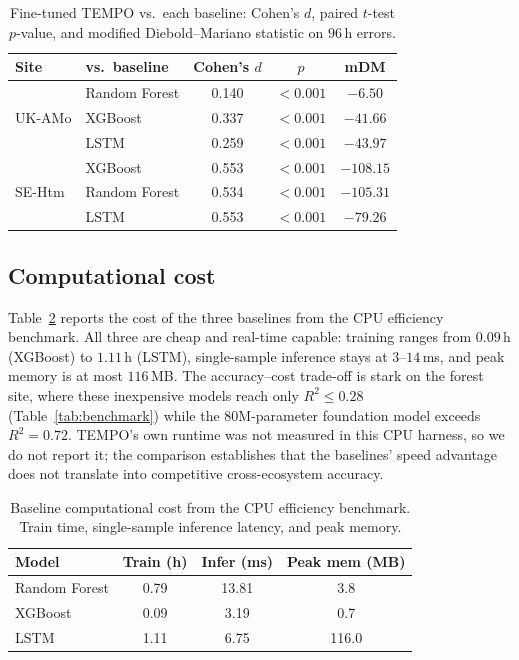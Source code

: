 \documentclass[sigconf]{acmart}          %
\begin{document}
\begin{table}[t]
  \centering
  \caption{Fine-tuned TEMPO vs.\ each baseline: Cohen's $d$, paired $t$-test
  $p$-value, and modified Diebold--Mariano statistic on $96$\,h errors.}
  \label{tab:sig}
  \small
  \begin{tabular}{@{}llccc@{}}
    \toprule
    Site & vs.\ baseline & Cohen's $d$ & $p$ & mDM \\
    \midrule
    \multirow{3}{*}{UK-AMo}
      & Random Forest & 0.140 & $<0.001$ & $-6.50$ \\
      & XGBoost       & 0.337 & $<0.001$ & $-41.66$ \\
      & LSTM          & 0.259 & $<0.001$ & $-43.97$ \\
    \midrule
    \multirow{3}{*}{SE-Htm}
      & XGBoost       & 0.553 & $<0.001$ & $-108.15$ \\
      & Random Forest & 0.534 & $<0.001$ & $-105.31$ \\
      & LSTM          & 0.553 & $<0.001$ & $-79.26$ \\
    \bottomrule
  \end{tabular}
\end{table}

\subsection{Computational cost}
\label{sec:cost}
Table~\ref{tab:cost} reports the cost of the three baselines from the CPU
efficiency benchmark. All three are cheap and real-time capable: training
ranges from $0.09$\,h (XGBoost) to $1.11$\,h (LSTM), single-sample inference
stays at $3$--$14$\,ms, and peak memory is at most $116$\,MB. The accuracy--cost
trade-off is stark on the forest site, where these inexpensive models reach
only $R^2\le0.28$ (Table~\ref{tab:benchmark}) while the $80$M-parameter
foundation model exceeds $R^2=0.72$. TEMPO's own runtime was not measured in
this CPU harness, so we do not report it; the comparison establishes that the
baselines' speed advantage does not translate into competitive cross-ecosystem
accuracy.

\begin{table}[t]
  \centering
  \caption{Baseline computational cost from the CPU efficiency benchmark.
  Train time, single-sample inference latency, and peak memory.}
  \label{tab:cost}
  \small
  \begin{tabular}{@{}lccc@{}}
    \toprule
    Model & Train (h) & Infer (ms) & Peak mem (MB) \\
    \midrule
    Random Forest & 0.79 & 13.81 & 3.8 \\
    XGBoost       & 0.09 & 3.19  & 0.7 \\
    LSTM          & 1.11 & 6.75  & 116.0 \\
    \bottomrule
  \end{tabular}
\end{table}
\end{document}
